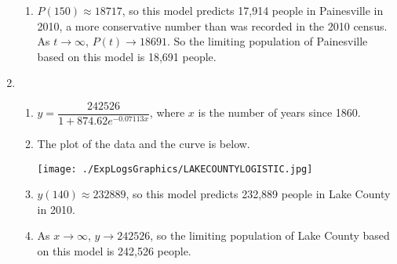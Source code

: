 \begin{enumerate}
\begin{enumerate}
\item $P(150) \approx 18717$, so this model predicts 17,914 people in Painesville in 2010, a more conservative number than was recorded in the 2010 census.  As $t \rightarrow \infty$, $P(t) \rightarrow 18691$.  So the limiting population of Painesville based on this model is 18,691 people.

\enlargethispage{\baselineskip}

\end{enumerate}

\item \begin{enumerate}  \item  $y = \dfrac{242526}{1+874.62e^{-0.07113x}}$, where $x$ is the number of years since 1860.

\item  The plot of the data and the curve is below.

\centerline{\texttt{[image: ./ExpLogsGraphics/LAKECOUNTYLOGISTIC.jpg]} }

\item  $y(140) \approx 232889$, so this model predicts 232,889 people in Lake County in 2010.

\item  As $x \rightarrow \infty$, $y \rightarrow 242526$, so the limiting population of Lake County based on this model is 242,526 people.

\end{enumerate}

\end{enumerate}

\closegraphsfile